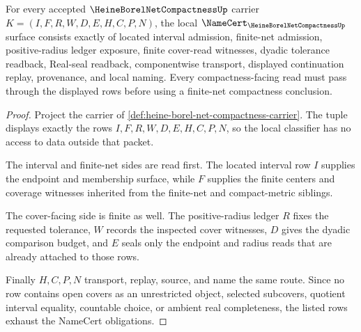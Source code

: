 \begin{theorem}
\label{thm:heine-borel-net-compactness-obligations}
For every accepted $\HeineBorelNetCompactnessUp$ carrier $K=(I,F,R,W,D,E,H,C,P,N)$, the local $\NameCert_{\HeineBorelNetCompactnessUp}$ surface consists exactly of located interval admission, finite-net admission, positive-radius ledger exposure, finite cover-read witnesses, dyadic tolerance readback, Real-seal readback, componentwise transport, displayed continuation replay, provenance, and local naming. Every compactness-facing read must pass through the displayed rows before using a finite-net compactness conclusion.
\end{theorem}
\begin{proof}
Project the carrier of \autoref{def:heine-borel-net-compactness-carrier}. The tuple displays exactly the rows $I,F,R,W,D,E,H,C,P,N$, so the local classifier has no access to data outside that packet.

The interval and finite-net sides are read first. The located interval row $I$ supplies the endpoint and membership surface, while $F$ supplies the finite centers and coverage witnesses inherited from the finite-net and compact-metric siblings.

The cover-facing side is finite as well. The positive-radius ledger $R$ fixes the requested tolerance, $W$ records the inspected cover witnesses, $D$ gives the dyadic comparison budget, and $E$ seals only the endpoint and radius reads that are already attached to those rows.

Finally $H,C,P,N$ transport, replay, source, and name the same route. Since no row contains open covers as an unrestricted object, selected subcovers, quotient interval equality, countable choice, or ambient real completeness, the listed rows exhaust the NameCert obligations.
\end{proof}

